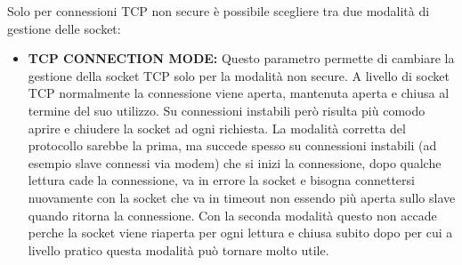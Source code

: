 Solo per connessioni TCP non secure è possibile scegliere tra due modalità
di gestione delle socket:

\begin{itemize}
    \item \textbf{TCP CONNECTION MODE:}
    Questo parametro permette di cambiare la gestione della socket TCP solo per la 
    modalità non secure. A livello di socket TCP normalmente la connessione viene aperta,
    mantenuta aperta e chiusa al termine del suo utilizzo.
    Su connessioni instabili però risulta più comodo aprire e 
    chiudere la socket ad ogni richiesta.
    La modalità corretta del protocollo sarebbe la prima,
    ma succede spesso 
    su connessioni instabili (ad esempio slave connessi via modem) che si inizi la connessione,
    dopo qualche lettura cade la connessione, va in errore la socket e bisogna connettersi nuovamente
    con la socket che va in timeout non essendo più aperta sullo slave 
    quando ritorna la connessione. Con la seconda
    modalità questo non accade perche la socket viene riaperta per ogni lettura 
    e chiusa subito dopo per cui a livello pratico questa modalità può tornare molto utile.
\end{itemize}